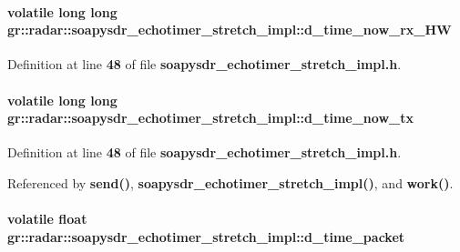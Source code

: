 \paragraph[{d\+\_\+time\+\_\+now\+\_\+rx\+\_\+\+HW}]{\setlength{\rightskip}{0pt plus 5cm}volatile long long gr\+::radar\+::soapysdr\+\_\+echotimer\+\_\+stretch\+\_\+impl\+::d\+\_\+time\+\_\+now\+\_\+rx\+\_\+\+HW\hspace{0.3cm}{\ttfamily [private]}}\label{classgr_1_1radar_1_1soapysdr__echotimer__stretch__impl_a5108e3b07a8bab2069e096bc5f7d4b32}


Definition at line {\bf 48} of file {\bf soapysdr\+\_\+echotimer\+\_\+stretch\+\_\+impl.\+h}.

\paragraph[{d\+\_\+time\+\_\+now\+\_\+tx}]{\setlength{\rightskip}{0pt plus 5cm}volatile long long gr\+::radar\+::soapysdr\+\_\+echotimer\+\_\+stretch\+\_\+impl\+::d\+\_\+time\+\_\+now\+\_\+tx\hspace{0.3cm}{\ttfamily [private]}}\label{classgr_1_1radar_1_1soapysdr__echotimer__stretch__impl_aee27e44793cb0f6d84cd4330198c92fb}


Definition at line {\bf 48} of file {\bf soapysdr\+\_\+echotimer\+\_\+stretch\+\_\+impl.\+h}.



Referenced by {\bf send()}, {\bf soapysdr\+\_\+echotimer\+\_\+stretch\+\_\+impl()}, and {\bf work()}.

\paragraph[{d\+\_\+time\+\_\+packet}]{\setlength{\rightskip}{0pt plus 5cm}volatile float gr\+::radar\+::soapysdr\+\_\+echotimer\+\_\+stretch\+\_\+impl\+::d\+\_\+time\+\_\+packet\hspace{0.3cm}{\ttfamily [private]}}\label{classgr_1_1radar_1_1soapysdr__echotimer__stretch__impl_a4b7e0f48dc8004ea3ae5c3a367b55b8f}


